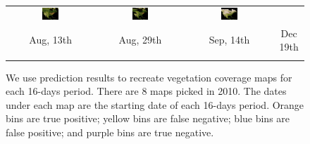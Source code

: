 \begin{figure}
\begin{center}
\begin{tabular}{cccc}
\includegraphics[width=0.20\textwidth]{map/83.png} &
\includegraphics[width=0.20\textwidth]{map/84.png} &
\includegraphics[width=0.20\textwidth]{map/91.png}  \\
Aug, 13th&Aug, 29th&Sep, 14th&Dec 19th\\
\\
\end{tabular}
\end{center}
\vspace{-24pt}
\caption{%
We use prediction results to recreate vegetation coverage maps for each 16-days period. There are 8 maps picked in 2010. The dates under each map are the starting date of each 16-days period.
Orange bins are true positive; yellow bins are false negative; blue bins are false positive; and purple bins are true negative.}
\label{fig:map}
\vspace{-12pt}
\end{figure}
%
%
%
